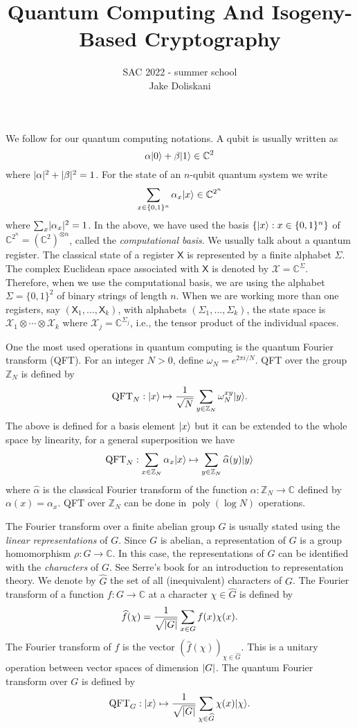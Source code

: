 \documentclass[11pt]{article}
\title{Quantum Computing And Isogeny-Based Cryptography}
\author{
    SAC 2022 - summer school \\
	Jake Doliskani
}
\date{}
\theoremstyle{plain}
\theoremstyle{definition}
\DeclareMathOperator{\poly}{poly}
\DeclarePairedDelimiter{\abs}{\lvert}{\rvert}
\DeclarePairedDelimiter{\ket}{\lvert}{\rangle}
\def\C{\mathbb{C}}
\def\Z{\mathbb{Z}}
\def\X{\mathcal{X}}
\begin{document}
\maketitle




We follow \cite{watrous2018theory} for our quantum computing notations. A qubit is usually written as
\[ \alpha\ket{0} + \beta\ket{1} \in \C^2 \]
where $\abs{\alpha}^2 + \abs{\beta}^2 = 1$. For the state of an $n$-qubit quantum system we write
\[ \sum_{x \in \{0, 1\}^n} \alpha_x \ket{x} \in \C^{2^n} \]
where $\sum_x \abs{\alpha_x}^2 = 1$. In the above, we have used the basis $\{ \ket{x} : x \in \{0, 1\}^n \}$ of $\C^{2^n} = (\C^2)^{\otimes n}$, called the \textit{computational basis}. We usually talk about a quantum register. The classical state  of a register $\mathsf{X}$ is represented by a finite alphabet $\Sigma$. The complex Euclidean space associated with $\mathsf{X}$ is denoted by $\X = \C^\Sigma$. Therefore, when we use the computational basis, we are using the alphabet $\Sigma = \{0, 1\}^2$ of binary strings of length $n$. When we are working more than one registers, say $(\mathsf{X}_1, \dots, \mathsf{X}_k)$, with alphabets $(\Sigma_1, \dots, \Sigma_k)$, the state space is $\X_1 \otimes \cdots \otimes \X_k$ where $\X_j = \C^{\Sigma_j}$, i.e., the tensor product of the individual spaces.  

One the most used operations in quantum computing is the quantum Fourier transform (QFT). For an integer $N > 0$, define $\omega_N = e^{2\pi i / N}$. QFT over the group $\Z_N$ is defined by
\[ \mathrm{QFT}_N: \ket{x} \mapsto \frac{1}{\sqrt{N}} \sum_{y \in \Z_N} \omega_N^{xy} \ket{y}. \]
The above is defined for a basis element $\ket{x}$ but it can be extended to the whole space by linearity, for a general superposition we have
\[ \mathrm{QFT}_N: \sum_{x \in \Z_N} \alpha_x \ket{x} \mapsto \sum_{y \in \Z_N} \widehat{\alpha}(y) \ket{y} \]
where $\widehat{\alpha}$ is the classical Fourier transform of the function $\alpha: \Z_N \rightarrow \C$ defined by $\alpha(x) = \alpha_x$. QFT over $\Z_N$ can be done in $\poly(\log N)$ operations.

The Fourier transform over a finite abelian group $G$ is usually stated using the \textit{linear representations} of $G$. Since $G$ is abelian, a representation of $G$ is a group homomorphism $\rho: G \rightarrow \C$. In this case, the representations of $G$ can be identified with the \textit{characters} of $G$. See Serre's book \cite{serre1977linear} for an introduction to representation theory. We denote by $\widehat{G}$ the set of all (inequivalent) characters of $G$. The Fourier transform of a function $f: G \rightarrow \C$ at a character $\chi \in \widehat{G}$ is defined by
\[ \widehat{f}(\chi) = \frac{1}{\sqrt{\abs{G}}} \sum_{x \in G} f(x)\chi(x). \]
The Fourier transform of $f$ is the vector $(\widehat{f}(\chi))_{\chi \in \widehat{G}}$. This is a unitary operation between vector spaces of dimension $\abs{G}$. The quantum Fourier transform over $G$ is defined by
\[ \mathrm{QFT}_G: \ket{x} \mapsto \frac{1}{\sqrt{\abs{G}}} \sum_{\chi \in \widehat{G}} \chi(x) \ket{\chi}. \]
\end{document}
